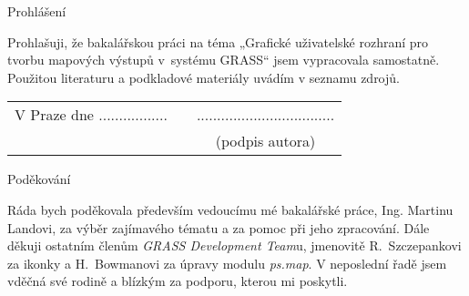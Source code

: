 \newcommand{\odsaditodzhora}{\hskip1pt\vfill}

\odsaditodzhora
\noindent Prohlášení

Prohlašuji, že bakalářskou práci na téma „Grafické uživatelské rozhraní pro
tvorbu mapových výstupů v~systému GRASS“ jsem vypracovala samostatně. Pou\-žitou
literaturu a podkladové materiály uvádím v seznamu
zdrojů.

\begin{flushleft}
\begin{tabular}{cp{}c}
V Praze dne .................
& 
&
..................................
\\
&&
(podpis autora)
\end{tabular}

\end{flushleft}
\newpage

\odsaditodzhora
\noindent Poděkování

Ráda bych poděkovala především vedoucímu mé bakalářské práce, Ing. Martinu
Landovi, za výběr zajímavého tématu a za pomoc při jeho zpracování. Dále děkuji
ostatním členům \emph{GRASS Development Team}u, jmenovitě R.~Szczepankovi za
ikonky a H.~Bowmanovi za úpravy modulu \emph{ps.map}. V neposlední řadě jsem
vděčná své rodině a blízkým za podporu, kterou mi poskytli.

\newpage
